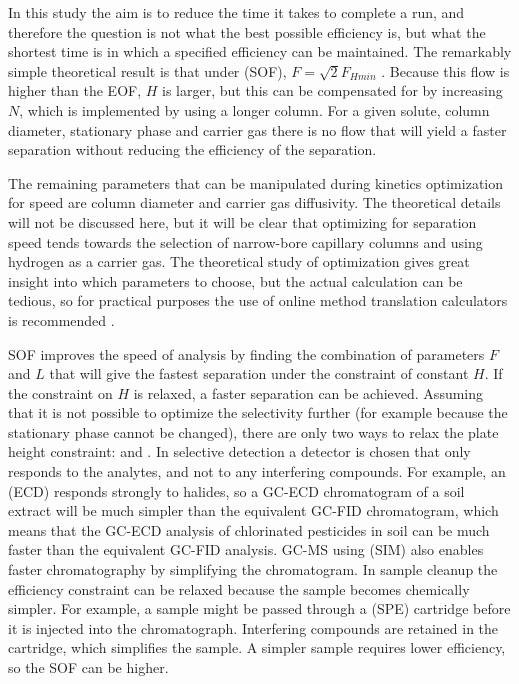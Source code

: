 In this study the aim is to reduce the time it takes to complete a run, and
therefore the question is not what the best possible efficiency is, but what the
shortest time is in which a specified efficiency can be maintained. The
remarkably simple theoretical result is that under  (SOF), \(F = \sqrt{2}F_{Hmin}\) \autocite{Blumberg1997}. Because this flow
is higher than the EOF, \(H\) is larger, but this can be compensated for by
increasing \(N\), which is implemented by using a longer column. For a given
solute, column diameter, stationary phase and carrier gas there is no flow that
will yield a faster separation without reducing the efficiency of the separation.

The remaining parameters that can be manipulated during kinetics optimization
for speed are column diameter and carrier gas diffusivity. The theoretical
details will not be discussed here, but it will be clear that optimizing for
separation speed tends towards the selection of narrow-bore capillary columns
and using hydrogen as a carrier gas. The theoretical study of optimization gives
great insight into which parameters to choose, but the actual calculation can be
tedious, so for practical purposes the use of online method translation
calculators is recommended \autocite{Restek2014}.


SOF improves the speed of analysis by finding the combination of parameters
\(F\) and \(L\) that will give the fastest separation under the constraint of
constant \(H\). If the constraint on \(H\) is relaxed, a faster separation can
be achieved. Assuming that it is not possible to optimize the selectivity
further (for example because the stationary phase cannot be changed), there are
only two ways to relax the plate height constraint:  and . In selective detection a detector is
chosen that only responds to the analytes, and not to any interfering compounds.
For example, an  (ECD) responds strongly to
halides, so a GC-ECD chromatogram of a soil extract will be much simpler than
the equivalent GC-FID chromatogram, which means that the GC-ECD analysis of
chlorinated pesticides in soil can be much faster than the equivalent GC-FID
analysis. GC-MS using  (SIM) also enables faster
chromatography by simplifying the chromatogram. In sample cleanup the efficiency
constraint can be relaxed because the sample becomes chemically simpler. For
example, a sample might be passed through a 
(SPE) cartridge before it is injected into the chromatograph. Interfering
compounds are retained in the cartridge, which simplifies the sample. A simpler
sample requires lower efficiency, so the SOF can be higher.

